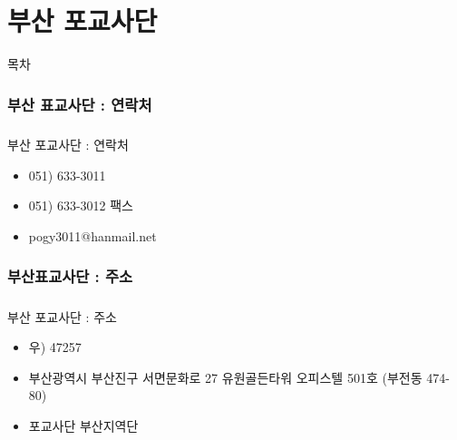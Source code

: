 \documentclass[aspectratio=1610,14pt,xcolor=pdftex,dvipsnames,table,handout]{beamer}
\begin{document}
		\part{ 부산 포교사단 }
		\frame{\partpage}

		\begin{frame} [plain]{목차}
		\tableofcontents%
		\end{frame}



		\section{ 부산 표교사단 : 연락처  }
		\begin{frame} [t,plain]
		\frametitle{ }
			\begin{block} { 부산 포교사단 : 연락처  }
			\setlength{\leftmargini}{3em}			
			\begin{itemize}
			\item 051) 633-3011
			\item 051) 633-3012 팩스
			\item pogy3011@hanmail.net
			\end{itemize}
			\end{block}						
								
		\end{frame}						



		\section{ 부산표교사단 : 주소 }
		\begin{frame} [t,plain]
		\frametitle{ }
			\begin{block} { 부산 포교사단 : 주소 }
			\setlength{\leftmargini}{3em}			
			\begin{itemize}
			\item 우) 47257
			\item 부산광역시 부산진구 서면문화로 27 유원골든타워 오피스텔 501호 (부전동 474-80)
			\item 포교사단 부산지역단
			\end{itemize}
			\end{block}						
								
		\end{frame}						
\end{document}
